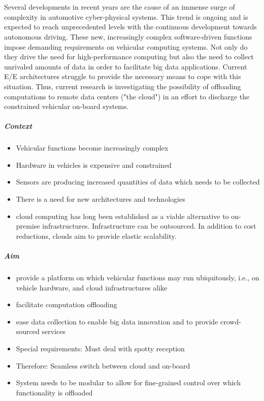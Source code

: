 \chapter{\abstractname}
Several developments in recent years are the cause of an immense surge of complexity in automotive cyber-physical systems. This trend is ongoing and is expected to reach unprecedented levels with the continuous development towards autonomous driving. These new, increasingly complex software-driven functions impose demanding requirements on vehicular computing systems. Not only do they drive the need for high-performance computing but also the need to collect unrivaled amounts of data in order to facilitate big data applications. Current E/E architectures struggle to provide the necessary means to cope with this situation. Thus, current research is investigating the possibility of offloading computations to remote data centers ("the cloud") in an effort to discharge the constrained vehicular on-board systems.  


\noindent
\paragraph{Context}
\begin{itemize}
\item Vehicular functions become increasingly complex
\item Hardware in vehicles is expensive and constrained
\item Sensors are producing increased quantities of data which needs to be collected
\item There is a need for new architectures and technologies
\item cloud computing has long been established as a viable alternative to on-premise infrastructures. Infrastructure can be outsourced. In addition to cost reductions, clouds aim to provide elastic scalability.
\end{itemize}

\noindent
\paragraph{Aim}
\begin{itemize}
\item provide a platform on which vehicular functions may run ubiquitously, i.e., on vehicle hardware, and cloud infrastructures alike
\item facilitate computation offloading
\item ease data collection to enable big data innovation and to provide crowd-sourced services
\item Special requirements: Must deal with spotty reception
\item Therefore: Seamless switch between cloud and on-board
\item System needs to be modular to allow for fine-grained control over which functionality is offloaded
\end{itemize}

